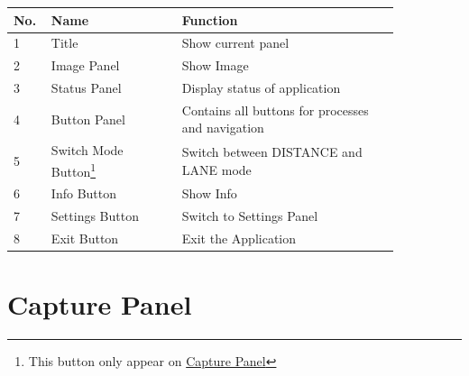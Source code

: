 \begin{table}[!ht]
    \centering
    \begin{minipage}{\textwidth} %
        \begin{tabular}{p{0.05\linewidth} | p{0.3\linewidth} | p{0.5\linewidth}}
            \hline
            \textbf{No.} & \textbf{Name}                                                                                       & \textbf{Function}                                 \\ \hline
            1            & Title                                                                                               & Show current panel                                \\ \hline
            2            & Image Panel                                                                                         & Show Image                                        \\ \hline
            3            & Status Panel                                                                                        & Display status of application                     \\ \hline
            4            & Button Panel                                                                                        & Contains all buttons for processes and navigation \\ \hline
            5            & Switch Mode Button\footnote{This button only appear on \hyperref[sec:capture-panel]{Capture Panel}} & Switch between DISTANCE and LANE mode             \\ \hline
            6            & Info Button                                                                                         & Show Info                                         \\ \hline
            7            & Settings Button                                                                                     & Switch to Settings Panel                          \\ \hline
            8            & Exit Button                                                                                         & Exit the Application                              \\ \hline
        \end{tabular}
    \end{minipage} %
\end{table}

\pagebreak
\section{Capture Panel}
\label{sec:capture-panel}

